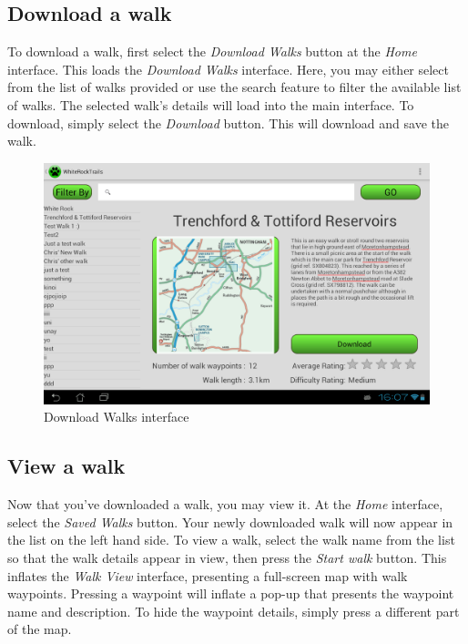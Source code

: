 \documentclass[11pt,a4paper]{report}
\begin{document}
\subsection{Download a walk}
\label{sec:download_a_walk}

To download a walk, first select the \emph{Download Walks} button at the \emph{Home} interface. This loads the \emph{Download Walks} interface. Here, you may either select from the list of walks provided or use the search feature to filter the available list of walks. The selected walk's details will load into the main interface. To download, simply select the \emph{Download} button. This will download and save the walk.
 
\begin{figure}[H]
\centering
\includegraphics[width=0.8\linewidth]{./img/chris/download_walk}
\caption{Download Walks interface}
\label{fig:download_a_walk}
\end{figure}

\subsection{View a walk}
\label{sec:view_walk}

Now that you've downloaded a walk, you may view it. At the \emph{Home} interface, select the \emph{Saved Walks} button. Your newly downloaded walk will now appear in the list on the left hand side. To view a walk, select the walk name from the list so that the walk details appear in view, then press the \emph{Start walk} button. This inflates the \emph{Walk View} interface, presenting a full-screen map with walk waypoints. Pressing a waypoint will inflate a pop-up that presents the waypoint name and description. To hide the waypoint details, simply press a different part of the map.
\end{document}
